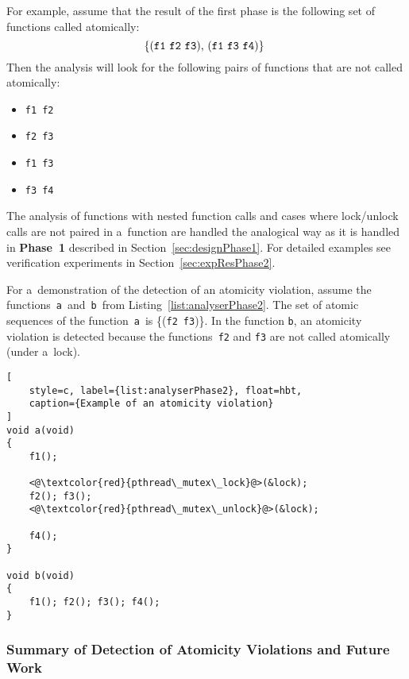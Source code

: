 \begin{example}
    For example, assume that the result of the first phase is the following
    set of functions called atomically:
    $$
        \text{%
            \{(\texttt{f1}~\texttt{f2}~\texttt{f3}),
            (\texttt{f1}~\texttt{f3}~\texttt{f4})\}
        }
    $$
    Then the analysis will look
    for the following pairs of functions that are not called atomically:
    \begin{itemize}
        \item \texttt{f1}~\texttt{f2}
        \item \texttt{f2}~\texttt{f3}
        \item \texttt{f1}~\texttt{f3}
        \item \texttt{f3}~\texttt{f4}
    \end{itemize}
\end{example}

The analysis of functions with nested function calls and cases
where lock/unlock calls are not paired in a~function are handled
the analogical way as it is handled in \textbf{Phase~1} described in
Section~\ref{sec:designPhase1}. For detailed examples see verification
experiments in Section~\ref{sec:expResPhase2}.

\begin{example}
    For a~demonstration of the detection of an atomicity violation, assume
    the functions~\texttt{a}~and~\texttt{b}~from
    Listing~\ref{list:analyserPhase2}. The set of atomic sequences of the
    function~\texttt{a}~is \{(\texttt{f2}~\texttt{f3})\}. In the function
    \texttt{b}, an atomicity violation is detected because the
    functions~\texttt{f2} and \texttt{f3} are not called atomically (under
    a~lock).
\end{example}

\begin{lstlisting}[
    style=c, label={list:analyserPhase2}, float=hbt,
    caption={Example of an atomicity violation}
]
void a(void)
{
    f1();

    <@\textcolor{red}{pthread\_mutex\_lock}@>(&lock);
    f2(); f3();
    <@\textcolor{red}{pthread\_mutex\_unlock}@>(&lock);

    f4();
}

void b(void)
{
    f1(); f2(); f3(); f4();
}
\end{lstlisting}

\subsubsection{Summary of Detection of Atomicity Violations and Future Work}

